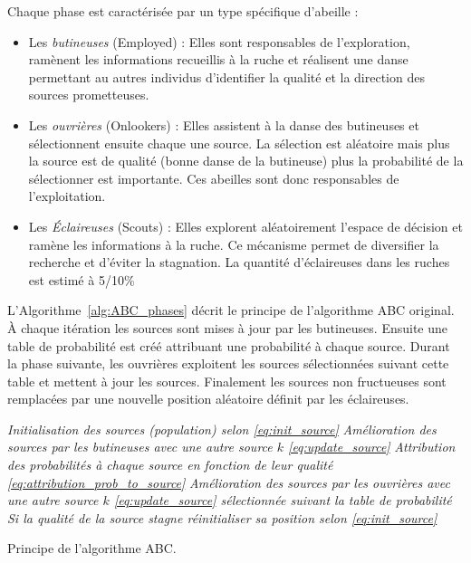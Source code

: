 \noindent Chaque phase est caractérisée par un type spécifique d’abeille :
\begin{itemize}
  \item Les \emph{butineuses} (Employed) : Elles sont responsables de l’exploration,
        ramènent les informations recueillis à la ruche et réalisent une danse
        permettant au autres individus d’identifier la qualité et la direction des
        sources prometteuses.
  \item Les \emph{ouvrières} (Onlookers) : Elles assistent à la danse des butineuses
        et sélectionnent ensuite chaque une source. La sélection est aléatoire mais plus
        la source est de qualité (bonne danse de la butineuse) plus la probabilité
        de la sélectionner est importante. Ces abeilles sont donc responsables de l’exploitation.
  \item Les \emph{Éclaireuses} (Scouts) : Elles explorent aléatoirement l’espace
        de décision et ramène les informations à la ruche. Ce mécanisme
        permet de diversifier la recherche et d’éviter la stagnation. La quantité
        d’éclaireuses dans les ruches est estimé à 5/10\si{\percent} \parencite{Seeley1996}
\end{itemize}

L’Algorithme~\ref{alg:ABC_phases} décrit le principe de l’algorithme ABC original.
À chaque itération les sources sont mises à jour par les butineuses. Ensuite une
table de probabilité est créé attribuant une probabilité à chaque source. Durant la
phase suivante, les ouvrières exploitent les sources sélectionnées suivant cette
table et mettent à jour les sources. Finalement les sources non fructueuses sont
remplacées par une nouvelle position aléatoire définit par les éclaireuses.
\begin{algorithm}\label{alg:ABC_phases}
  \SetAlgoVlined
  \emph{Initialisation des sources (population) selon \eqref{eq:init_source}}\;
  {
  {
    \emph{Amélioration des sources par les butineuses avec une autre source $k$ \eqref{eq:update_source}}\;
    \emph{Attribution des probabilités à chaque source en fonction de leur qualité
          \eqref{eq:attribution_prob_to_source}}\;
    \emph{Amélioration des sources par les ouvrières avec une autre source $k$ \eqref{eq:update_source}
          sélectionnée suivant la table de probabilité}\;
    \emph{Si la qualité de la source stagne réinitialiser sa position selon \eqref{eq:init_source}}\;
  }
  }
  \caption{Principe de l’algorithme ABC.}
\end{algorithm}

